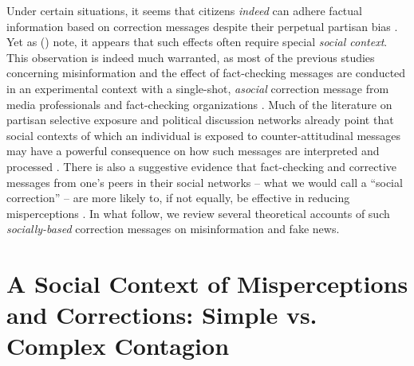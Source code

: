 \documentclass[man, 12pt, a4paper, noextraspace]{apa6}
\begin{document}
  Under certain situations, it seems that citizens \emph{indeed} can adhere factual information based on correction messages despite their perpetual partisan bias \parencite[e.g.,][]{Wood2018, nyhan2017taking}. Yet as \citeauthor{margolin2017} (\citeyear{margolin2017}) note, it appears that such effects often require special \emph{social context}. This observation is indeed much warranted, as most of the previous studies concerning misinformation and the effect of fact-checking messages are conducted in an experimental context with a single-shot, \emph{asocial} correction message from media professionals and fact-checking organizations \parencite[e.g.,][]{nyhan2010corrections,garrett2013undermining,weeks2015emotions}. Much of the literature on partisan selective exposure and political discussion networks already point that social contexts of which an individual is exposed to counter-attitudinal messages may have a powerful consequence on how such messages are interpreted and processed \parencite{messing2014selective, levitan2008resistance}. There is also a suggestive evidence that fact-checking and corrective messages from one's peers in their social networks -- what we would call a \enquote{social correction} -- are more likely to, if not equally, be effective in reducing misperceptions \parencite[e.g.,][]{margolin2017, bode2017see}. In what follow, we review several theoretical accounts of such \emph{socially-based} correction messages on misinformation and fake news.   
      
\section{A Social Context of Misperceptions and Corrections: Simple vs. Complex Contagion}
\end{document}
